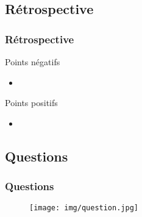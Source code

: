 \documentclass{beamer}
\begin{document}
		\subsection{Rétrospective}
			\begin{frame}
				\frametitle{Rétrospective}
				\begin{alertblock}{ Points négatifs }
					\begin{itemize}
						\item
					\end{itemize}
				\end{alertblock}
				\begin{exampleblock}{ Points positifs }
					\begin{itemize}
						\item
					\end{itemize}
				\end{exampleblock}
			\end{frame}

		\subsection{Questions}
			\begin{frame}
				\frametitle{Questions}
				\begin{figure}
					\texttt{[image: img/question.jpg]}
				\end{figure}
			\end{frame}
			
			
\end{document}
